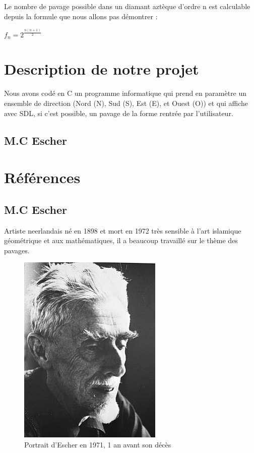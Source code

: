 \documentclass{article}
\begin{document}
Le nombre de pavage possible dans un diamant aztèque d'ordre n est calculable depuis la formule que nous allons pas démontrer :

\begin{center}
    $f_{n}=2^{\frac{n\left ( n+1 \right )}{2}}$
\end{center}

\clearpage

\section{Description de notre projet}

Nous avons codé en C un programme informatique qui prend en paramètre un ensemble de direction (Nord (N), Sud (S), Est (E), et Ouest (O)) et qui affiche avec SDL, si c'est possible, un pavage de la forme rentrée par l'utilisateur.



\subsection{M.C Escher}

\clearpage

\section{Références}

\subsection{M.C Escher}

\label{M.C Escher}

Artiste neerlandais né en 1898 et mort en 1972 très sensible à l’art islamique géométrique et aux mathématiques, il a beaucoup travaillé sur le thème des pavages.

\begin{figure} [!h]
    \center
    \includegraphics [scale=0.25] {image/escher.jpg}
    \caption{Portrait d'Escher en 1971, 1 an avant son décès}
\end{figure}
\end{document}
